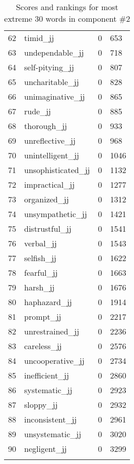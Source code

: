 \begin{longtable}[!htbp]{| rlr@{.}l |}
    62 & timid\_jj & 0 & 653 \\
    63 & undependable\_jj & 0 & 718 \\
    64 & self-pitying\_jj & 0 & 807 \\
    65 & uncharitable\_jj & 0 & 828 \\
    66 & unimaginative\_jj & 0 & 865 \\
    67 & rude\_jj & 0 & 885 \\
    68 & thorough\_jj & 0 & 933 \\
    69 & unreflective\_jj & 0 & 968 \\
    70 & unintelligent\_jj & 0 & 1046 \\
    71 & unsophisticated\_jj & 0 & 1132 \\
    72 & impractical\_jj & 0 & 1277 \\
    73 & organized\_jj & 0 & 1312 \\
    74 & unsympathetic\_jj & 0 & 1421 \\
    75 & distrustful\_jj & 0 & 1541 \\
    76 & verbal\_jj & 0 & 1543 \\
    77 & selfish\_jj & 0 & 1622 \\
    78 & fearful\_jj & 0 & 1663 \\
    79 & harsh\_jj & 0 & 1676 \\
    80 & haphazard\_jj & 0 & 1914 \\
    81 & prompt\_jj & 0 & 2217 \\
    82 & unrestrained\_jj & 0 & 2236 \\
    83 & careless\_jj & 0 & 2576 \\
    84 & uncooperative\_jj & 0 & 2734 \\
    85 & inefficient\_jj & 0 & 2860 \\
    86 & systematic\_jj & 0 & 2923 \\
    87 & sloppy\_jj & 0 & 2932 \\
    88 & inconsistent\_jj & 0 & 2961 \\
    89 & unsystematic\_jj & 0 & 3020 \\
    90 & negligent\_jj & 0 & 3299 \\
    \hline
    \caption{Scores and rankings for most extreme 30 words in component \#2} \\
\end{longtable}

